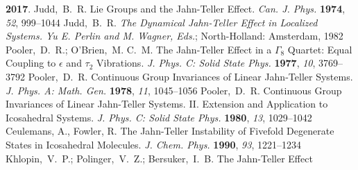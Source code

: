 \documentclass[superscriptaddress,showpacs,amsmath,amssymb,pra,twocolumn]{revtex4-1}
\begin{document}
\begin{thebibliography}{61}
  \textbf{2017}. \relax
\mciteBstWouldAddEndPunctfalse
\mciteSetBstMidEndSepPunct{\mcitedefaultmidpunct}
{}{\mcitedefaultseppunct}\relax
\EndOfBibitem
{}
Judd,~B.~R. Lie {{Groups}} and the Jahn-Teller Effect. \emph{Can. J. Phys.} \textbf{1974}, \emph{52}, 999--1044\relax
\mciteBstWouldAddEndPuncttrue
\mciteSetBstMidEndSepPunct{\mcitedefaultmidpunct}
{\mcitedefaultendpunct}{\mcitedefaultseppunct}\relax
\EndOfBibitem
{}
Judd,~B.~R. \emph{The {{Dynamical Jahn}}-{{Teller Effect}} in {{Localized
  Systems}}. {{Yu E}}. {{Perlin}} and {{M}}. {{Wagner}}, {{Eds}}.};
  {North-Holland}: Amsterdam, 1982\relax
\mciteBstWouldAddEndPuncttrue
\mciteSetBstMidEndSepPunct{\mcitedefaultmidpunct}
{\mcitedefaultendpunct}{\mcitedefaultseppunct}\relax
\EndOfBibitem
{}
Pooler,~D.~R.; O'Brien,~M. C.~M. The {{Jahn}}-{{Teller}} Effect in a
$\Gamma_8$ Quartet: Equal Coupling to $\epsilon$ and
$\tau_2$ Vibrations. \emph{J. Phys. C: Solid State
  Phys.} \textbf{1977}, \emph{10}, 3769--3792\relax
\mciteBstWouldAddEndPuncttrue
\mciteSetBstMidEndSepPunct{\mcitedefaultmidpunct}
{\mcitedefaultendpunct}{\mcitedefaultseppunct}\relax
\EndOfBibitem
{}
Pooler,~D.~R. Continuous Group Invariances of Linear {{Jahn}}-{{Teller}}
  Systems. \emph{J. Phys. A: Math. Gen.} \textbf{1978},
  \emph{11}, 1045--1056\relax
\mciteBstWouldAddEndPuncttrue
\mciteSetBstMidEndSepPunct{\mcitedefaultmidpunct}
{\mcitedefaultendpunct}{\mcitedefaultseppunct}\relax
\EndOfBibitem
{}
Pooler,~D.~R. Continuous Group Invariances of Linear {{Jahn}}-{{Teller}}
  Systems. {{II}}. {{Extension}} and Application to Icosahedral Systems.
  \emph{J. Phys. C: Solid State
  Phys.} \textbf{1980}, \emph{13},
  1029--1042\relax
\mciteBstWouldAddEndPuncttrue
\mciteSetBstMidEndSepPunct{\mcitedefaultmidpunct}
{\mcitedefaultendpunct}{\mcitedefaultseppunct}\relax
\EndOfBibitem
{}
{Ceulemans, A., Fowler, R.} The Jahn-Teller Instability of
  Fivefold Degenerate States in Icosahedral Molecules. \emph{J. Chem. Phys.} \textbf{1990}, \emph{93}, 1221--1234\relax
\mciteBstWouldAddEndPuncttrue
\mciteSetBstMidEndSepPunct{\mcitedefaultmidpunct}
{\mcitedefaultendpunct}{\mcitedefaultseppunct}\relax
\EndOfBibitem
{}
Khlopin,~V.~P.; Polinger,~V.~Z.; Bersuker,~I.~B. The {{Jahn}}-{{Teller}} Effect

\end{thebibliography}
\end{document}
